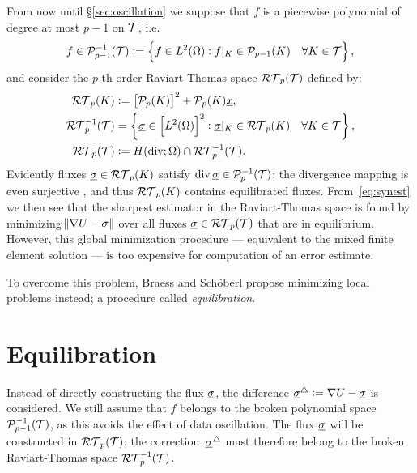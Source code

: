 \documentclass[thesis.tex]{subfiles}
\begin{document}
From now until \S\ref{sec:oscillation} we suppose that $f$ is a piecewise polynomial of degree at most $p-1$ on $\mathcal{T}$, i.e.
\[
  f\in \mathcal{P}_{p-1}^{-1}(\mathcal{T}) := \set{ f \in L^2(\Omega): f|_K \in \mathcal{P}_{p-1}(K) \quad \forall K \in \mathcal{T}},
\]
and consider the  $p$-th order Raviart-Thomas space $\mathcal{RT}_p(\mathcal{T})$ defined by:
\begin{align*} 
  \mathcal{RT}_p(K)    &:= \left[ \mathcal{P}_p(K)\right]^2 + \mathcal{P}_p(K)\underline{x}, \\
  \mathcal{RT}_p^{-1}(\mathcal{T}) &= \set{ \underline{\sigma} \in \left[L^2(\Omega)\right]^2 : \underline{\sigma}|_K \in \mathcal{RT}_p(K) \quad \forall K \in \mathcal{T}},\\
  \mathcal{RT}_p(\mathcal{T}) &:= H(\operatorname{div}; \Omega) \cap \mathcal{RT}_p^{-1}(\mathcal{T}).
\end{align*}
Evidently fluxes $\underline{\sigma} \in \mathcal{RT}_p(K)$ satisfy $\operatorname{div} \underline{\sigma} \in \mathcal{P}_p^{-1}(\mathcal{T})$; the divergence mapping
is even surjective \cite[Prop~2.3.3]{brezzimixed}, and thus $\mathcal{RT}_p(K)$ contains equilibrated fluxes.
 From~\eqref{eq:synest} we then see that 
the sharpest estimator in the Raviart-Thomas space is found by minimizing $\norm{\nabla U - \sigma}$ over all 
fluxes $\underline{\sigma} \in \mathcal{RT}_p(\mathcal{T})$ that are in equilibrium. However,
this global minimization procedure --- equivalent to the mixed finite element solution \cite{braess2007finite} --- 
is too expensive for computation of an error estimate.

To overcome this problem, Braess and Sch\"oberl \cite{braessequil} propose minimizing local problems instead; a procedure
called \emph{equilibration}.

\section{Equilibration} 
Instead of directly constructing the flux $\underline{\sigma}$, the difference $\underline{\sigma}^\triangle := \nabla U -  \underline{\sigma}$ is considered.
We still assume that $f$ belongs to the broken polynomial space $\mathcal{P}_{p-1}^{-1}(\mathcal{T})$, as this avoids the effect of
data oscillation.  The flux $\underline{\sigma}$ will be constructed in $\mathcal{RT}_p(\mathcal{T})$; the correction~$\underline{\sigma}^\triangle$ must 
therefore belong to the broken Raviart-Thomas space $\mathcal{RT}_p^{-1}(\mathcal{T})$.
\end{document}
